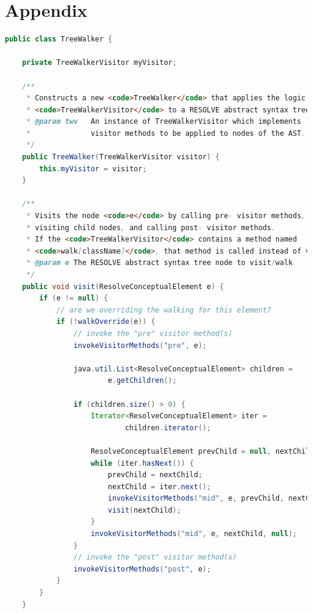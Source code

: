 \documentclass[times]{speauth}
\begin{document}



\newpage
\section{Appendix} \label{app:codelistings}
\begin{lstlisting}[language=java,caption={TreeWalker.java}]
public class TreeWalker {

    private TreeWalkerVisitor myVisitor;

    /**
     * Constructs a new <code>TreeWalker</code> that applies the logic of
     * <code>TreeWalkerVisitor</code> to a RESOLVE abstract syntax tree.
     * @param twv	An instance of TreeWalkerVisitor which implements
     * 				visitor methods to be applied to nodes of the AST.
     */
    public TreeWalker(TreeWalkerVisitor visitor) {
        this.myVisitor = visitor;
    }

    /**
     * Visits the node <code>e</code> by calling pre- visitor methods, recursively
     * visiting child nodes, and calling post- visitor methods.
     * If the <code>TreeWalkerVisitor</code> contains a method named
     * <code>walk[className]</code>, that method is called instead of visiting the children.
     * @param e	The RESOLVE abstract syntax tree node to visit/walk
     */
    public void visit(ResolveConceptualElement e) {
        if (e != null) {
            // are we overriding the walking for this element?
            if (!walkOverride(e)) {
                // invoke the "pre" visitor method(s)
                invokeVisitorMethods("pre", e);

                java.util.List<ResolveConceptualElement> children =
                        e.getChildren();

                if (children.size() > 0) {
                    Iterator<ResolveConceptualElement> iter =
                            children.iterator();

                    ResolveConceptualElement prevChild = null, nextChild = null;
                    while (iter.hasNext()) {
                        prevChild = nextChild;
                        nextChild = iter.next();
                        invokeVisitorMethods("mid", e, prevChild, nextChild);
                        visit(nextChild);
                    }
                    invokeVisitorMethods("mid", e, nextChild, null);
                }
                // invoke the "post" visitor method(s)
                invokeVisitorMethods("post", e);
            }
        }
    }


\end{lstlisting}
\end{document}
